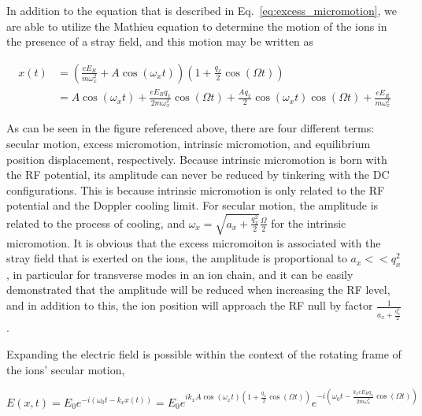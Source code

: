 In addition to the equation that is described in Eq.~\eqref{eq:excess_micromotion}, we are able to utilize the Mathieu equation to determine the motion of the ions in the presence of a stray field, and this motion may be written as

\begin{equation}
    \begin{aligned}
        x(t) & =\left(\frac{e E_R}{m \omega_x^2}+A \cos \left(\omega_x t\right)\right)\left(1+\frac{q_x}{2} \cos (\Omega t)\right)                                                      \\
             & =A \cos \left(\omega_x t\right)+\frac{e E_R q_x}{2 m \omega_x^2} \cos (\Omega t)+\frac{A q_x}{2} \cos \left(\omega_x t\right) \cos (\Omega t)+\frac{e E_R}{m \omega_x^2}
    \end{aligned}
\end{equation}

As can be seen in the figure referenced above, there are four different terms: secular motion, excess micromotion, intrinsic micromotion, and equilibrium position displacement, respectively. Because intrinsic micromotion is born with the RF potential, its amplitude can never be reduced by tinkering with the DC configurations. This is because intrinsic micromotion is only related to the RF potential and the Doppler cooling limit. For secular motion, the amplitude is related to the process of cooling, and \(\omega_x=\sqrt{a_x+\frac{q_x^2}{2}}\frac{\Omega}{2}\) for the intrinsic micromotion. It is obvious that the excess micromoiton is associated with the stray field that is exerted on the ions, the amplitude is proportional to \(a_x<<q_x^2\), in particular for transverse modes in an ion chain, and it can be easily demonstrated that the amplitude will be reduced when increasing the RF level, and in addition to this, the ion position will approach the RF null by factor \(\frac{1}{a_x+\frac{q_x^2}{2}}\).

Expanding the electric field is possible within the context of the rotating frame of the ions' secular motion,

\begin{equation}
    E(x, t)=E_0 e^{-i\left(\omega_0 t-k_x x(t)\right)}=E_0 e^{i k_x A \cos \left(\omega_x t\right)\left(1+\frac{q_x}{2} \cos (\Omega t)\right)} e^{-i\left(\omega_0 t-\frac{k_x e E_R q_x}{2 m \omega_x^2} \cos (\Omega t)\right)}
\end{equation}


